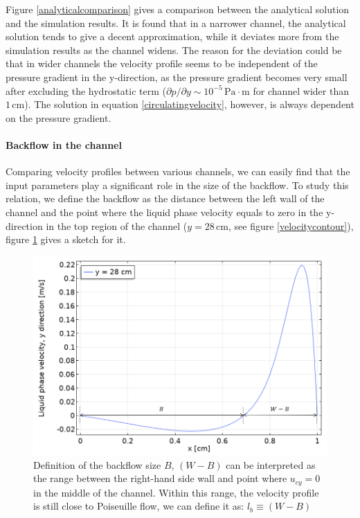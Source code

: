 Figure \ref{analyticalcomparison} gives a comparison between the analytical solution and the simulation results. It is found that in a narrower channel, the analytical solution tends to give a decent approximation, while it deviates more from the simulation results as the channel widens. The reason for the deviation could be that in wider channels the velocity profile seems to be independent of the pressure gradient in the y-direction, as the pressure gradient becomes very small after excluding the hydrostatic term ($\partial p/ \partial y \sim 10^{-5} \, \mathrm{Pa \cdot m}$ for channel wider than $1 \,  \mathrm{cm}$). The solution in equation \ref{circulatingvelocity}, however, is always dependent on the pressure gradient.

\paragraph{Backflow in the channel}
\*

Comparing velocity profiles between various channels, we can easily find that the input parameters play a significant role in the size of the backflow. To study this relation, we define the backflow as the distance between the left wall of the channel and the point where the liquid phase velocity equals to zero in the y-direction in the top region of the channel ($ y = 28 \, \mathrm{cm} $, see figure \ref{velocitycontour}), figure \ref{backflowdefinition} gives a sketch for it.

\begin{figure}
    \centering
    \includegraphics[scale = 0.6]{Backflowdefinition.png}
    \caption{Definition of the backflow size $B$, $(W-B)$ can be interpreted as the range between the right-hand side wall and point where $u_{cy}=0$ in the middle of the channel. Within this range, the velocity profile is still close to Poiseuille flow, we can define it as: $l_b \equiv (W-B)$}
    \label{backflowdefinition}
\end{figure}

